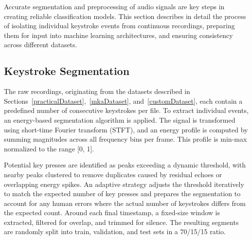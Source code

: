 \documentclass[a4paper,11pt,twoside]{report}
\theoremstyle{definition}
\begin{document}
Accurate segmentation and preprocessing of audio signals are key steps in creating reliable classification models. This section describes in detail the process of isolating individual keystroke events from continuous recordings, preparing them for input into machine learning architectures, and ensuring consistency across different datasets.

\subsection{Keystroke Segmentation}

The raw recordings, originating from the datasets described in Sections~\ref{practicalDataset},~\ref{mkaDataset}, and~\ref{customDataset}, each contain a predefined number of consecutive keystrokes per file. To extract individual events, an energy-based segmentation algorithm is applied. The signal is transformed using short-time Fourier transform (STFT), and an energy profile is computed by summing magnitudes across all frequency bins per frame. This profile is min-max normalized to the range [0, 1].

Potential key presses are identified as peaks exceeding a dynamic threshold, with nearby peaks clustered to remove duplicates caused by residual echoes or overlapping energy spikes. An adaptive strategy adjusts the threshold iteratively to match the expected number of key presses and prepares the segmentation to account for any human errors where the actual number of keystrokes differs from the expected count. Around each final timestamp, a fixed-size window is extracted, filtered for overlap, and trimmed for silence. The resulting segments are randomly split into train, validation, and test sets in a 70/15/15 ratio.
\end{document}

